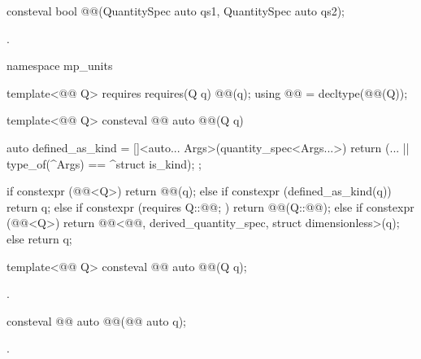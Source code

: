 \begin{itemdecl}
consteval bool @@(QuantitySpec auto qs1, QuantitySpec auto qs2);
\end{itemdecl}

\begin{itemdescr}
\pnum
\returns
{}.
\end{itemdescr}

\begin{codeblock}
namespace mp_units {

template<@@ Q>
  requires requires(Q q) { @@(q); }
using @@ = decltype(@@(Q{}));

template<@@ Q>
consteval @@ auto @@(Q q)
{
  auto defined_as_kind = []<auto... Args>(quantity_spec<Args...>) {
    return (... || type_of(^Args) == ^struct is_kind);
  };

  if constexpr (@@<Q>) {
    return @@(q);
  } else if constexpr (defined_as_kind(q)) {
    return q;
  } else if constexpr (requires { Q::@@; }) {
    return @@(Q::@@);
  } else if constexpr (@@<Q>) {
    return @@<@@, derived_quantity_spec, struct dimensionless>(q);
  } else {
    return q;
  }
}

}
\end{codeblock}

\begin{itemdecl}
template<@@ Q>
consteval @@ auto @@(Q q);
\end{itemdecl}

\begin{itemdescr}
\pnum
\returns
{}.
\end{itemdescr}

\begin{itemdecl}
consteval @@ auto @@(@@ auto q);
\end{itemdecl}

\begin{itemdescr}
\pnum
\returns
{}.
\end{itemdescr}

